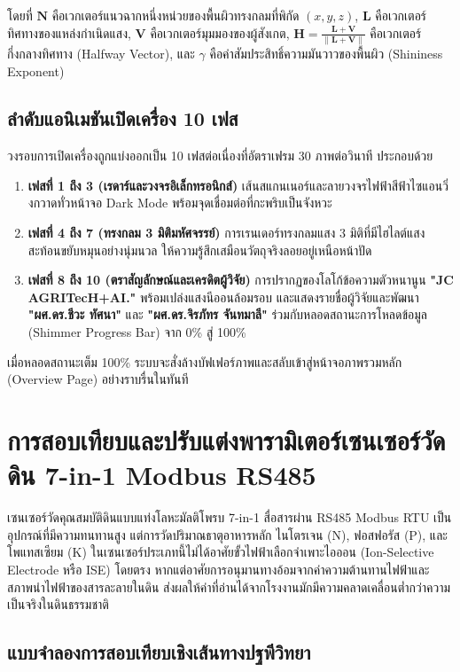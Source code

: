 โดยที่ $\mathbf{N}$ คือเวกเตอร์แนวฉากหนึ่งหน่วยของพื้นผิวทรงกลมที่พิกัด $(x, y, z)$, $\mathbf{L}$ คือเวกเตอร์ทิศทางของแหล่งกำเนิดแสง, $\mathbf{V}$ คือเวกเตอร์มุมมองของผู้สังเกต, $\mathbf{H} = \frac{\mathbf{L} + \mathbf{V}}{\|\mathbf{L} + \mathbf{V}\|}$ คือเวกเตอร์กึ่งกลางทิศทาง (Halfway Vector), และ $\gamma$ คือค่าสัมประสิทธิ์ความมันวาวของพื้นผิว (Shininess Exponent)

\subsection{ลำดับแอนิเมชันเปิดเครื่อง 10 เฟส}

วงรอบการเปิดเครื่องถูกแบ่งออกเป็น 10 เฟสต่อเนื่องที่อัตราเฟรม 30 ภาพต่อวินาที ประกอบด้วย
\begin{enumerate}
    \item \textbf{เฟสที่ 1 ถึง 3 (เรดาร์และวงจรอิเล็กทรอนิกส์)} เส้นสแกนเนอร์และลายวงจรไฟฟ้าสีฟ้าไซแอนวิ่งกวาดทั่วหน้าจอ Dark Mode พร้อมจุดเชื่อมต่อที่กะพริบเป็นจังหวะ
    \item \textbf{เฟสที่ 4 ถึง 7 (ทรงกลม 3 มิติมหัศจรรย์)} การเรนเดอร์ทรงกลมแสง 3 มิติที่มีไฮไลต์แสงสะท้อนขยับหมุนอย่างนุ่มนวล ให้ความรู้สึกเสมือนวัตถุจริงลอยอยู่เหนือหน้าปัด
    \item \textbf{เฟสที่ 8 ถึง 10 (ตราสัญลักษณ์และเครดิตผู้วิจัย)} การปรากฏของโลโก้ข้อความตัวหนานูน \textbf{"JC AGRITecH+AI."} พร้อมเปล่งแสงนีออนล้อมรอบ และแสดงรายชื่อผู้วิจัยและพัฒนา \textbf{"ผศ.ดร.ชีวะ ทัศนา"} และ \textbf{"ผศ.ดร.จิรภัทร จันทมาลี"} ร่วมกับหลอดสถานะการโหลดข้อมูล (Shimmer Progress Bar) จาก 0\% สู่ 100\%
\end{enumerate}
เมื่อหลอดสถานะเต็ม 100\% ระบบจะสั่งล้างบัฟเฟอร์ภาพและสลับเข้าสู่หน้าจอภาพรวมหลัก (Overview Page) อย่างราบรื่นในทันที

\section{การสอบเทียบและปรับแต่งพารามิเตอร์เซนเซอร์วัดดิน 7-in-1 Modbus RS485}

เซนเซอร์วัดคุณสมบัติดินแบบแท่งโลหะมัลติโพรบ 7-in-1 สื่อสารผ่าน RS485 Modbus RTU เป็นอุปกรณ์ที่มีความทนทานสูง แต่การวัดปริมาณธาตุอาหารหลัก ไนโตรเจน (N), ฟอสฟอรัส (P), และโพแทสเซียม (K) ในเซนเซอร์ประเภทนี้ไม่ได้อาศัยขั้วไฟฟ้าเลือกจำเพาะไอออน (Ion-Selective Electrode หรือ ISE) โดยตรง หากแต่อาศัยการอนุมานทางอ้อมจากค่าความต้านทานไฟฟ้าและสภาพนำไฟฟ้าของสารละลายในดิน ส่งผลให้ค่าที่อ่านได้จากโรงงานมักมีความคลาดเคลื่อนต่ำกว่าความเป็นจริงในดินธรรมชาติ

\subsection{แบบจำลองการสอบเทียบเชิงเส้นทางปฐพีวิทยา}

